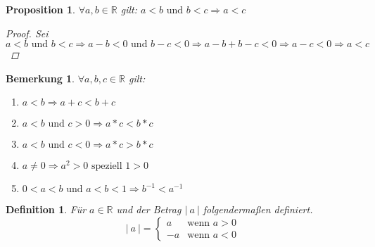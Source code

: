 \documentclass[a4paper,titlepage,oneside]{article}
\def\R{\ensuremath{\mathbb{R}} }
\newcommand{\fa}{\ensuremath{\forall}}
\newcommand{\abs}[1]{\ensuremath{\left|\:#1\:\right|}}
\theoremstyle{thmstyle}
\newtheorem{prop}[satz]{Proposition}
\newtheorem{defi}[satz]{Definition}
\newtheorem{bem}[satz]{Bemerkung}
\begin{document}
\begin{prop}
\(\fa a, b \in \R \) gilt: \(a < b \text{ und } b < c \Rightarrow a < c\)
\begin{proof}
Sei \( a < b \text{ und } b < c \Rightarrow a - b < 0  \text{ und } b - c < 0 \Rightarrow a - b + b - c < 0 \Rightarrow a - c < 0 \Rightarrow a < c\)
\end{proof}
\end{prop}

\begin{bem}
\(\fa a, b, c \in \R\) gilt:
\begin{enumerate}[label=\alph*)]
\item \(a < b \Rightarrow a + c < b + c\)
\item \(a < b \text{ und } c > 0 \Rightarrow a * c < b * c\)
\item \(a < b \text{ und } c < 0 \Rightarrow a * c > b * c\)
\item \(a \ne 0 \Rightarrow a^2 > 0 \text{ speziell } 1 > 0\)
\item \(0 < a < b \text{ und } a < b < 1 \Rightarrow b^{-1} < a^{-1}\)
\end{enumerate}
\end{bem}

\begin{defi}
Für \(a \in \R\) und der Betrag \abs{a} folgendermaßen definiert. 
\[\abs{a} = \begin{cases}
 a & \text{wenn } a > 0\\
-a & \text{wenn } a < 0
\end{cases}\]
\end{defi}
\end{document}

